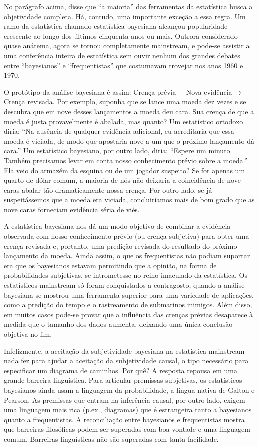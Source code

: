 \documentclass[11pt,a5paper,twoside]{book}
\begin{document}
No parágrafo acima, disse que “a maioria” das ferramentas da estatística busca a objetividade completa. Há, contudo, uma importante exceção a essa regra. Um ramo da estatística chamado estatística bayesiana alcançou popularidade crescente ao longo dos últimos cinquenta anos ou mais. Outrora considerado quase anátema, agora se tornou completamente mainstream, e pode-se assistir a uma conferência inteira de estatística sem ouvir nenhum dos grandes debates entre “bayesianos” e “frequentistas” que costumavam trovejar nos anos 1960 e 1970.

O protótipo da análise bayesiana é assim: Crença prévia + Nova evidência → Crença revisada. Por exemplo, suponha que se lance uma moeda dez vezes e se descubra que em nove desses lançamentos a moeda deu cara. Sua crença de que a moeda é justa provavelmente é abalada, mas quanto? Um estatístico ortodoxo diria: “Na ausência de qualquer evidência adicional, eu acreditaria que essa moeda é viciada, de modo que apostaria nove a um que o próximo lançamento dá cara.” Um estatístico bayesiano, por outro lado, diria: “Espere um minuto. Também precisamos levar em conta nosso conhecimento prévio sobre a moeda.” Ela veio do armazém da esquina ou de um jogador suspeito? Se for apenas um quarto de dólar comum, a maioria de nós não deixaria a coincidência de nove caras abalar tão dramaticamente nossa crença. Por outro lado, se já suspeitássemos que a moeda era viciada, concluiríamos mais de bom grado que as nove caras forneciam evidência séria de viés.

A estatística bayesiana nos dá um modo objetivo de combinar a evidência observada com nosso conhecimento prévio (ou crença subjetiva) para obter uma crença revisada e, portanto, uma predição revisada do resultado do próximo lançamento da moeda. Ainda assim, o que os frequentistas não podiam suportar era que os bayesianos estavam permitindo que a opinião, na forma de probabilidades subjetivas, se intrometesse no reino imaculado da estatística. Os estatísticos mainstream só foram conquistados a contragosto, quando a análise bayesiana se mostrou uma ferramenta superior para uma variedade de aplicações, como a predição do tempo e o rastreamento de submarinos inimigos. Além disso, em muitos casos pode-se provar que a influência das crenças prévias desaparece à medida que o tamanho dos dados aumenta, deixando uma única conclusão objetiva no fim.

Infelizmente, a aceitação da subjetividade bayesiana na estatística mainstream nada fez para ajudar a aceitação da subjetividade causal, o tipo necessário para especificar um diagrama de caminhos. Por quê? A resposta repousa em uma grande barreira linguística. Para articular premissas subjetivas, os estatísticos bayesianos ainda usam a linguagem da probabilidade, a língua nativa de Galton e Pearson. As premissas que entram na inferência causal, por outro lado, exigem uma linguagem mais rica (p.ex., diagramas) que é estrangeira tanto a bayesianos quanto a frequentistas. A reconciliação entre bayesianos e frequentistas mostra que barreiras filosóficas podem ser superadas com boa vontade e uma linguagem comum. Barreiras linguísticas não são superadas com tanta facilidade.
\end{document}
